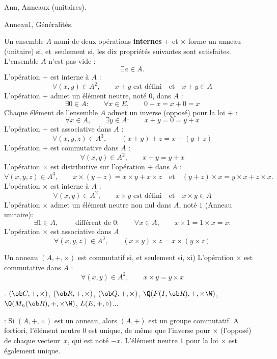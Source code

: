                              
\Section Ann, Anneaux (unitaires).

\Subsection Anneau1, G\'en\'eralit\'es. 

\Definition Un ensemble $A$ muni de deux op\'erations {\bf internes} $+$ et $\times$ forme un anneau (unitaire) si, et~seulement si, 
les dix propri\'et\'es suivantes sont satisfaites.
\pn
{} L'ensemble $A$ n'est pas vide : 
$$
\exists a\in A.
$$ 
 L'op\'eration $+$ est interne \`a $A$ : 
$$
\forall (x,y)\in A^2, \qquad x+y\mbox{ est d\'efini}\quad\mbox{et}\quad x+y\in A
$$
 L'op\'eration $+$ admet un \'el\'ement neutre, not\'e $0$, dans $A$ : 
$$
\exists 0\in A:\qquad \forall x\in E,\qquad 0+x=x+0=x
$$
 Chaque \'el\'ement de l'ensemble $A$ admet un inverse (oppos\'e) pour la loi $+$ : 
$$
\forall x\in A, \qquad \exists y\in A:\qquad x+y=0=y+x
$$
 L'op\'eration $+$ est associative dans $A$ :
$$
\forall (x,y,z)\in A^3, \qquad(x+y)+z=x+(y+z)
$$ 
 L'op\'eration $+$ est commutative dans $A$ : 
$$
\forall (x,y)\in A^2, \qquad x+y=y+x
$$
 L'op\'eration $\times$ est distributive sur l'op\'eration $+$ dans $A$ : 
$$
\forall(x,y,z)\in A^3, \qquad x\times(y+z)=x\times y+x\times z\quad\mbox{et}\quad (y+z)\times x=y\times x+z\times x.
$$ 
 L'op\'eration $\times$ est interne \`a $A$ : 
$$
\forall (x,y)\in A^2,\qquad x\times y\mbox{ est d\'efini}\quad \mbox{et}\quad x\times y\in A
$$
 L'op\'eration $\times$ admet un \'el\'ement neutre non nul dans $A$, not\'e $1$ (Anneau unitaire):
$$
\exists 1\in A, \qquad\mbox{ diff\'erent de }0: \qquad \forall x\in A, \qquad x\times1=1\times x=x.
$$ 
 L'op\'eration $\times$ est associative dans $A$
$$
\forall (x,y,z)\in A^3, \qquad(x\times y)\times z=x\times(y\times z)
$$ 

\bigskip

\noindent
\Definition []  Un anneau $(A,+,\times)$ est commutatif si, et seulement si, 
\bigskip
\noindent xi) L'op\'eration $\times$ est commutative dans $A$ : 
$$
\forall (x,y)\in A^2, \qquad x\times y=y\times x
$$
\bigskip

                             
\Exemples.  $(\ob C,+,\times)$, $(\ob R,+,\times)$, $(\ob Q, +,\times)$, $\Q(\sc F(I,\ob R),+,\times\W)$, $\Q(\sc M_n(\ob R),+,\times\W)$, $\sc L(E,+,\circ )$... 
\bigskip

\Remarque : Si $(A,+,\times)$ est un anneau, alors $(A,+)$ est un groupe commutatif. A fortiori, l'\'el\'ement neutre $0$ est unique, de m\^eme que 
l'inverse pour $\times$ (l'oppos\'e) de chaque vecteur~$x$, qui est not\'e $-x$. L'\'el\'ement neutre $1$ pour la loi $\times$ est \'egalement unique. 
\bigskip

